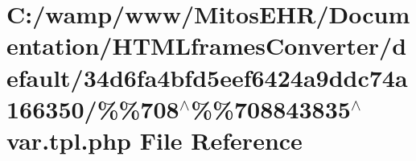 \hypertarget{default_234d6fa4bfd5eef6424a9ddc74a166350_2_06_06708_05_06_06708843835_05var_8tpl_8php}{\section{\-C\-:/wamp/www/\-Mitos\-E\-H\-R/\-Documentation/\-H\-T\-M\-Lframes\-Converter/default/34d6fa4bfd5eef6424a9ddc74a166350/\%\%708$^\wedge$\%\%708843835$^\wedge$var.tpl.\-php \-File \-Reference}
\label{default_234d6fa4bfd5eef6424a9ddc74a166350_2_06_06708_05_06_06708843835_05var_8tpl_8php}
}
